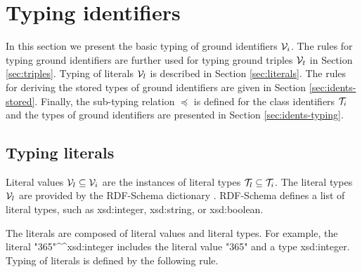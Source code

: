 \documentclass[runningheads]{llncs}
\newcommand{\I}{{\cal I}}
\newcommand{\V}{{\cal V}}
\newcommand{\T}{{\cal T}}
\newcommand{\memo}[1]{}
\newcommand{\notes}[1]{\noindent\begin{small}-- \emph{#1}\hfill\break\end{small}}
\begin{document}
\section{Typing identifiers}


In this section we present the basic typing of ground identifiers
$\V_i$. The rules for typing ground identifiers are further used for
typing ground triples $\V_t$ in Section \ref{sec:triples}.  Typing of
literals $\V_l$ is described in Section \ref{sec:literals}. The rules
for deriving the stored types of ground identifiers are given in
Section \ref{sec:idents-stored}. Finally, the sub-typing relation
$\preceq$ is defined for the class identifiers $\T_i$ and the types of
ground identifiers are presented in Section \ref{sec:idents-typing}.









\subsection{Typing literals\label{sec:literals}}

Literal values $\V_l\subseteq\V_i$ are the instances of literal types
$\T_l\subseteq\T_i$. The literal types $\V_l$ are provided by the
RDF-Schema dictionary \cite{rdfschema}. RDF-Schema defines a list of
literal types, such as xsd:integer, xsd:string, or xsd:boolean.

The literals are composed of literal values and literal types. For
example, the literal
"365"\textasciicircum\textasciicircum\/xsd:integer includes the
literal value "365" and a type xsd:integer. Typing of literals is
defined by the following rule.
\end{document}
